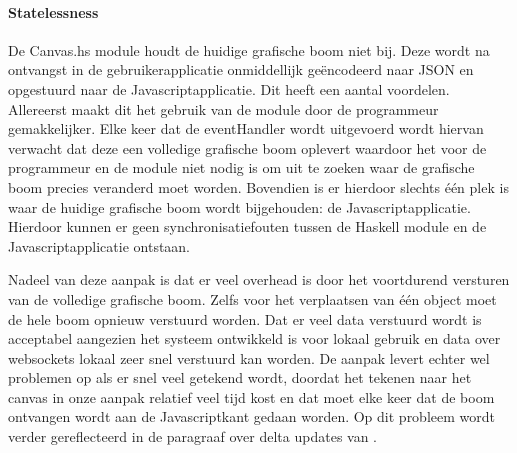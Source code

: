 \paragraph{Statelessness} \label{par:statelessness}
De Canvas.hs module houdt de huidige grafische boom niet bij. Deze wordt na ontvangst in de gebruikerapplicatie onmiddellijk geëncodeerd naar JSON en opgestuurd naar de Javascriptapplicatie. Dit heeft een aantal voordelen. Allereerst maakt dit het gebruik van de module door de programmeur gemakkelijker. Elke keer dat de eventHandler wordt uitgevoerd wordt hiervan verwacht dat deze een volledige grafische boom oplevert waardoor het voor de programmeur en de module niet nodig is om uit te zoeken waar de grafische boom precies veranderd moet worden. Bovendien is er hierdoor slechts één plek is waar de huidige grafische boom wordt bijgehouden: de Javascriptapplicatie. Hierdoor kunnen er geen synchronisatiefouten tussen de Haskell module en de Javascriptapplicatie ontstaan. 

Nadeel van deze aanpak is dat er veel overhead is door het voortdurend versturen van de volledige grafische boom. Zelfs voor het verplaatsen van één object moet de hele boom opnieuw verstuurd worden. Dat er veel data verstuurd wordt is acceptabel aangezien het systeem ontwikkeld is voor lokaal gebruik en data over websockets lokaal zeer snel verstuurd kan worden. De aanpak levert echter wel problemen op als er snel veel getekend wordt, doordat het tekenen naar het canvas in onze aanpak relatief veel tijd kost en dat moet elke keer dat de boom ontvangen wordt aan de Javascriptkant gedaan worden. Op dit probleem wordt verder gereflecteerd in de paragraaf over delta updates van .
